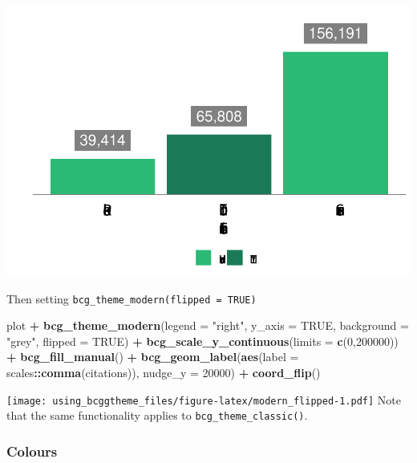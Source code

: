\documentclass[
]{article}
\newenvironment{Shaded}{\begin{snugshade}}{\end{snugshade}}
\newcommand{\DataTypeTok}[1]{\textcolor[rgb]{0.13,0.29,0.53}{#1}}
\newcommand{\DecValTok}[1]{\textcolor[rgb]{0.00,0.00,0.81}{#1}}
\newcommand{\KeywordTok}[1]{\textcolor[rgb]{0.13,0.29,0.53}{\textbf{#1}}}
\newcommand{\NormalTok}[1]{#1}
\newcommand{\OperatorTok}[1]{\textcolor[rgb]{0.81,0.36,0.00}{\textbf{#1}}}
\newcommand{\OtherTok}[1]{\textcolor[rgb]{0.56,0.35,0.01}{#1}}
\newcommand{\StringTok}[1]{\textcolor[rgb]{0.31,0.60,0.02}{#1}}
\begin{document}
\includegraphics{using_bcggtheme_files/figure-latex/unnamed-chunk-10-1.pdf}

Then setting \texttt{bcg\_theme\_modern(flipped\ =\ TRUE)}

\begin{Shaded}
\begin{Highlighting}[]
\NormalTok{plot }\OperatorTok{+}
\StringTok{  }\KeywordTok{bcg_theme_modern}\NormalTok{(}\DataTypeTok{legend =} \StringTok{"right"}\NormalTok{,}
                   \DataTypeTok{y_axis =} \OtherTok{TRUE}\NormalTok{,}
                   \DataTypeTok{background =} \StringTok{"grey"}\NormalTok{,}
                   \DataTypeTok{flipped =} \OtherTok{TRUE}\NormalTok{) }\OperatorTok{+}
\StringTok{  }\KeywordTok{bcg_scale_y_continuous}\NormalTok{(}\DataTypeTok{limits =} \KeywordTok{c}\NormalTok{(}\DecValTok{0}\NormalTok{,}\DecValTok{200000}\NormalTok{)) }\OperatorTok{+}
\StringTok{  }\KeywordTok{bcg_fill_manual}\NormalTok{() }\OperatorTok{+}
\StringTok{  }\KeywordTok{bcg_geom_label}\NormalTok{(}\KeywordTok{aes}\NormalTok{(}\DataTypeTok{label =}\NormalTok{ scales}\OperatorTok{::}\KeywordTok{comma}\NormalTok{(citations)), }\DataTypeTok{nudge_y =} \DecValTok{20000}\NormalTok{) }\OperatorTok{+}
\StringTok{  }\KeywordTok{coord_flip}\NormalTok{()}
\end{Highlighting}
\end{Shaded}

\texttt{[image: using\_bcggtheme\_files/figure-latex/modern\_flipped-1.pdf]}
Note that the same functionality applies to
\texttt{bcg\_theme\_classic()}.

\hypertarget{colours}{%
\subsubsection{Colours}\label{colours}}
\end{document}

